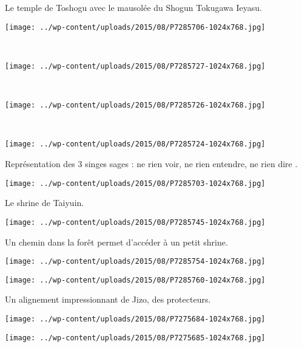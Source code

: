  Le temple de Toshogu avec le mausolée du Shogun Tokugawa Ieyasu. 
\begin{center} \texttt{[image: ../wp-content/uploads/2015/08/P7285706-1024x768.jpg]} \end{center}
~\\
\begin{center} \texttt{[image: ../wp-content/uploads/2015/08/P7285727-1024x768.jpg]} \end{center}
\vspace{-\topsep}
\pagebreak
~\\
\begin{center} \texttt{[image: ../wp-content/uploads/2015/08/P7285726-1024x768.jpg]} \end{center}
~
\begin{center} \texttt{[image: ../wp-content/uploads/2015/08/P7285724-1024x768.jpg]} \end{center}
\vspace{-\topsep}
\pagebreak

 Représentation des 3 singes sages : \og ne rien voir, ne rien entendre, ne rien dire \fg.
\begin{center} \texttt{[image: ../wp-content/uploads/2015/08/P7285703-1024x768.jpg]} \end{center}

 Le shrine de Taiyuin.
\begin{center} \texttt{[image: ../wp-content/uploads/2015/08/P7285745-1024x768.jpg]} \end{center}
\vspace{-\topsep}
\pagebreak

 Un chemin dans la forêt permet d'accéder à un petit shrine.
\begin{center} \texttt{[image: ../wp-content/uploads/2015/08/P7285754-1024x768.jpg]} \end{center}
\begin{center} \texttt{[image: ../wp-content/uploads/2015/08/P7285760-1024x768.jpg]} \end{center}
\vspace{-\topsep}
\vspace{-3.25mm}
\pagebreak

 Un alignement impressionnant de Jizo, des protecteurs.
\begin{center} \texttt{[image: ../wp-content/uploads/2015/08/P7275684-1024x768.jpg]} \end{center}
\begin{center} \texttt{[image: ../wp-content/uploads/2015/08/P7275685-1024x768.jpg]} \end{center}
\vspace{-\topsep}
\vspace{-3.25mm}
\pagebreak

